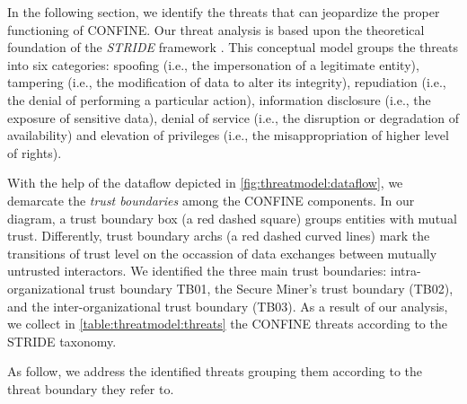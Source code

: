 \begin{newj}
	

In the following section, we identify the threats that can jeopardize the proper functioning of CONFINE. Our threat analysis is based upon the theoretical foundation of the \textit{STRIDE} framework \cite{aa}. This conceptual model groups the threats into six categories: spoofing (i.e., the impersonation of a legitimate entity), tampering (i.e., the modification of data to alter its integrity), repudiation (i.e., the denial of performing a particular action), information disclosure (i.e., the exposure of sensitive data), denial of service (i.e., the disruption or degradation of availability) and elevation of privileges (i.e., the misappropriation of higher level of rights). 

With the help of the dataflow depicted in \cref{fig:threatmodel:dataflow}, we demarcate the \textit{trust boundaries} among the CONFINE components. In our diagram, a trust boundary box (a red dashed square) groups entities with mutual trust. Differently, trust boundary archs (a red dashed curved lines) mark the transitions of trust level on the occassion of data exchanges between mutually untrusted interactors. We identified the three main trust boundaries: intra-organizational trust boundary TB01, the Secure Miner's trust boundary (TB02), and the inter-organizational trust boundary (TB03). As a result of our analysis, we collect in \cref{table:threatmodel:threats} the CONFINE threats according to the STRIDE taxonomy.

As follow, we address the identified threats grouping them according to the threat boundary they refer to. 
	

\end{newj}
